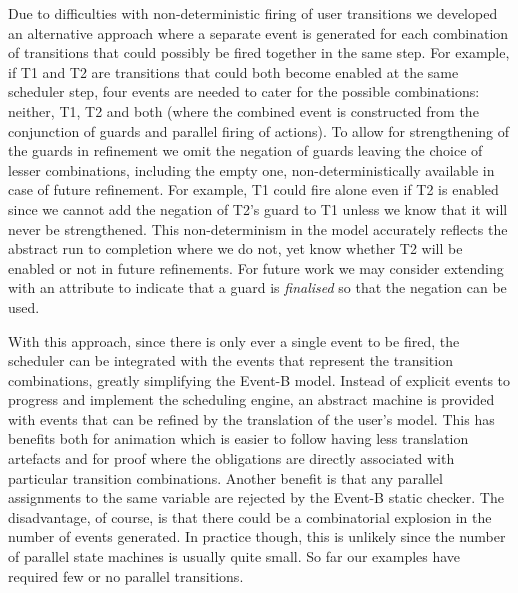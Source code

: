 Due to difficulties with non-deterministic firing of user transitions we developed an alternative approach where a separate event is generated for each combination of transitions that could possibly be fired together in the same step. 
For example, if T1 and T2 are transitions that could both become enabled at the same scheduler step, four events are needed to cater for the possible combinations: neither, T1, T2 and both (where the combined event is constructed from the conjunction of guards and parallel firing of actions). 
To allow for strengthening of the guards  in refinement we omit the negation of guards
leaving the choice of lesser combinations, including the empty one, non-deterministically available in case of future refinement.
For example, T1 could fire alone even if T2 is enabled since we cannot add the negation of T2's guard to T1 unless we know that it will never be strengthened. 
This non-determinism in the model accurately reflects the abstract run to completion where we do not, yet know whether T2 will be enabled or not in future refinements. 
For future work we may consider extending \SCXML with an attribute to indicate that a guard is \emph{finalised} so that the negation can be used.

With this approach, since there is only ever a single event to be fired, the scheduler can be integrated with the events that represent the transition combinations, greatly simplifying the Event-B model.
Instead of explicit events to progress and implement the scheduling engine, an abstract machine is provided with events that can be refined by the translation of the user's \SCXML model.
This has benefits both for animation which is easier to follow having less translation artefacts and for proof where the obligations are directly associated with particular transition combinations. 
Another benefit is that any parallel assignments to the same variable are rejected by the Event-B static checker.
The disadvantage, of course, is that there could be a combinatorial explosion in the number of events generated.
In practice though, this is unlikely since the number of parallel state machines is usually quite small.
So far our examples have required few or no parallel transitions.


